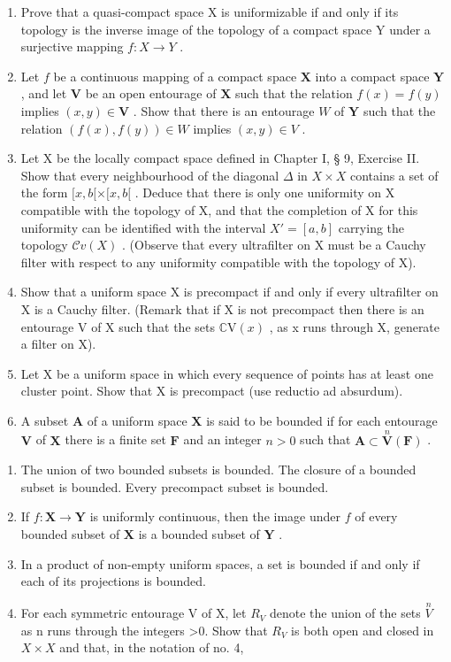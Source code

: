 \begin{enumerate}
\def\labelenumi{\arabic{enumi})}
\setcounter{enumi}{1}
\item
  Prove that a quasi-compact space X is uniformizable if and only if its topology is the inverse image of the topology of a compact space Y under a surjective mapping \(f: X \rightarrow Y\) .
\item
  Let \(f\) be a continuous mapping of a compact space \(\mathbf{X}\) into a compact space \(\mathbf{Y}\) , and let \(\mathbf{V}\) be an open entourage of \(\mathbf{X}\) such that the relation \(f(x) = f(y)\) implies \((x, y) \in \mathbf{V}\) . Show that there is an entourage \(W\) of \(\mathbf{Y}\) such that the relation \((f(x), f(y)) \in W\) implies \((x, y) \in V\) .
\item
  Let X be the locally compact space defined in Chapter I, § 9, Exercise II. Show that every neighbourhood of the diagonal \(\Delta\) in \(X \times X\) contains a set of the form \([x, b[ \times [x, b[\) . Deduce that there is only one uniformity on X compatible with the topology of X, and that the completion of X for this uniformity can be identified with the interval \(X' = [a, b]\) carrying the topology \(\mathcal{C}v(X)\) . (Observe that every ultrafilter on X must be a Cauchy filter with respect to any uniformity compatible with the topology of X).
\item
  Show that a uniform space X is precompact if and only if every ultrafilter on X is a Cauchy filter. (Remark that if X is not precompact then there is an entourage V of X such that the sets \(\mathbb{C}\mathrm{V}(x)\) , as x runs through X, generate a filter on X).
\item
  Let X be a uniform space in which every sequence of points has at least one cluster point. Show that X is precompact (use reductio ad absurdum).
\item
  A subset \(\mathbf{A}\) of a uniform space \(\mathbf{X}\) is said to be bounded if for each entourage \(\mathbf{V}\) of \(\mathbf{X}\) there is a finite set \(\mathbf{F}\) and an integer \(n > 0\) such that \(\mathbf{A} \subset \overset{n}{\mathbf{V}}(\mathbf{F})\) .
\end{enumerate}

\begin{enumerate}
\def\labelenumi{\alph{enumi})}
\item
  The union of two bounded subsets is bounded. The closure of a bounded subset is bounded. Every precompact subset is bounded.
\item
  If \(f: \mathbf{X} \to \mathbf{Y}\) is uniformly continuous, then the image under \(f\) of every bounded subset of \(\mathbf{X}\) is a bounded subset of \(\mathbf{Y}\) .
\item
  In a product of non-empty uniform spaces, a set is bounded if and only if each of its projections is bounded.
\item
  For each symmetric entourage V of X, let \(R_{V}\) denote the union of the sets \(\stackrel{n}{V}\) as n runs through the integers \textgreater0. Show that \(R_{V}\) is both open and closed in \(X \times X\) and that, in the notation of no. 4,
\end{enumerate}

